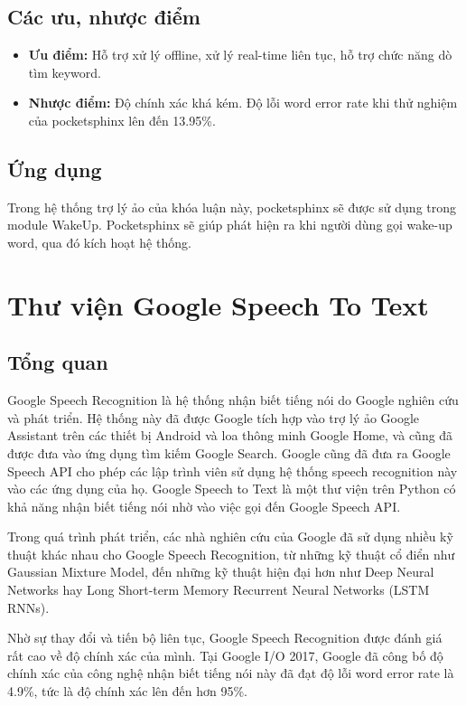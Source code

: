 \subsection{Các ưu, nhược điểm}

\begin{itemize}
    \item \textbf{Ưu điểm:} Hỗ trợ xử lý offline, xử lý real-time liên tục, hỗ trợ chức năng dò tìm keyword.
    \item \textbf{Nhược điểm:} Độ chính xác khá kém. Độ lỗi word error rate khi thử nghiệm của pocketsphinx lên đến 13.95\%\cite{huggins2006pocketsphinx}.
\end{itemize}

\subsection{Ứng dụng}

Trong hệ thống trợ lý ảo của khóa luận này, pocketsphinx sẽ được sử dụng trong module WakeUp. Pocketsphinx sẽ giúp phát hiện ra khi người dùng gọi wake-up word, qua đó kích hoạt hệ thống.

\section{Thư viện Google Speech To Text}

\subsection{Tổng quan}

Google Speech Recognition là hệ thống nhận biết tiếng nói do Google nghiên cứu và phát triển. Hệ thống này đã được Google tích hợp vào trợ lý ảo Google Assistant trên các thiết bị Android và loa thông minh Google Home, và cũng đã được đưa vào ứng dụng tìm kiếm Google Search. Google cũng đã đưa ra Google Speech API cho phép các lập trình viên sử dụng hệ thống speech recognition này vào các ứng dụng của họ. Google Speech to Text là một thư viện trên Python có khả năng nhận biết tiếng nói nhờ vào việc gọi đến Google Speech API.

Trong quá trình phát triển, các nhà nghiên cứu của Google đã sử dụng nhiều kỹ thuật khác nhau cho Google Speech Recognition, từ những kỹ thuật cổ điển như Gaussian Mixture Model, đến những kỹ thuật hiện đại hơn như Deep Neural Networks hay Long Short-term Memory Recurrent Neural Networks (LSTM RNNs)\cite{beaufays}.

Nhờ sự thay đổi và tiến bộ liên tục, Google Speech Recognition được đánh giá rất cao về độ chính xác của mình. Tại Google I/O 2017, Google đã công bố độ chính xác của công nghệ nhận biết tiếng nói này đã đạt độ lỗi word error rate là 4.9\%\cite{protalinski}, tức là độ chính xác lên đến hơn 95\%.


